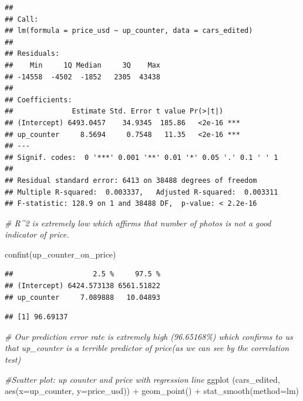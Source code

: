 \documentclass[
]{article}
\newenvironment{Shaded}{\begin{snugshade}}{\end{snugshade}}
\newcommand{\AttributeTok}[1]{\textcolor[rgb]{0.77,0.63,0.00}{#1}}
\newcommand{\CommentTok}[1]{\textcolor[rgb]{0.56,0.35,0.01}{\textit{#1}}}
\newcommand{\DecValTok}[1]{\textcolor[rgb]{0.00,0.00,0.81}{#1}}
\newcommand{\FunctionTok}[1]{\textcolor[rgb]{0.00,0.00,0.00}{#1}}
\newcommand{\NormalTok}[1]{#1}
\newcommand{\SpecialCharTok}[1]{\textcolor[rgb]{0.00,0.00,0.00}{#1}}
\begin{document}
\begin{verbatim}
## 
## Call:
## lm(formula = price_usd ~ up_counter, data = cars_edited)
## 
## Residuals:
##    Min     1Q Median     3Q    Max 
## -14558  -4502  -1852   2305  43438 
## 
## Coefficients:
##              Estimate Std. Error t value Pr(>|t|)    
## (Intercept) 6493.0457    34.9345  185.86   <2e-16 ***
## up_counter     8.5694     0.7548   11.35   <2e-16 ***
## ---
## Signif. codes:  0 '***' 0.001 '**' 0.01 '*' 0.05 '.' 0.1 ' ' 1
## 
## Residual standard error: 6413 on 38488 degrees of freedom
## Multiple R-squared:  0.003337,   Adjusted R-squared:  0.003311 
## F-statistic: 128.9 on 1 and 38488 DF,  p-value: < 2.2e-16
\end{verbatim}

\begin{Shaded}
\begin{Highlighting}[]
\CommentTok{\# R\^{}2 is extremely low which affirms that number of photos is not a good indicator of price. }

\FunctionTok{confint}\NormalTok{(up\_counter\_on\_price)}
\end{Highlighting}
\end{Shaded}

\begin{verbatim}
##                   2.5 %     97.5 %
## (Intercept) 6424.573138 6561.51822
## up_counter     7.089888   10.04893
\end{verbatim}

\begin{Shaded}
\end{Shaded}

\begin{verbatim}
## [1] 96.69137
\end{verbatim}

\begin{Shaded}
\begin{Highlighting}[]
\CommentTok{\# Our prediction error rate is extremely high (96.65168\%) which confirms to us that up\_counter is a terrible predictor of price(as we can see by the correlation test)}

\CommentTok{\#Scatter plot: up counter and price with regression line}
\FunctionTok{ggplot}\NormalTok{ (cars\_edited, }\FunctionTok{aes}\NormalTok{(}\AttributeTok{x=}\NormalTok{up\_counter, }\AttributeTok{y=}\NormalTok{price\_usd)) }\SpecialCharTok{+} \FunctionTok{geom\_point}\NormalTok{() }\SpecialCharTok{+} \FunctionTok{stat\_smooth}\NormalTok{(}\AttributeTok{method=}\NormalTok{lm)}
\end{Highlighting}
\end{Shaded}
\end{document}
